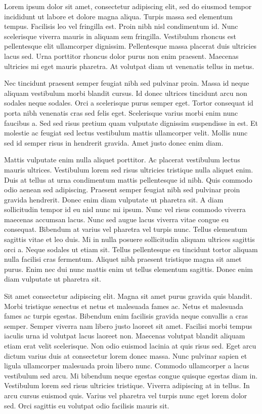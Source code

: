 Lorem ipsum dolor sit amet, consectetur adipiscing elit, sed do eiusmod tempor incididunt ut labore et dolore magna aliqua. Turpis massa sed elementum tempus. Facilisis leo vel fringilla est. Proin nibh nisl condimentum id. Nunc scelerisque viverra mauris in aliquam sem fringilla. Vestibulum rhoncus est pellentesque elit ullamcorper dignissim. Pellentesque massa placerat duis ultricies lacus sed. Urna porttitor rhoncus dolor purus non enim praesent. Maecenas ultricies mi eget mauris pharetra. At volutpat diam ut venenatis tellus in metus.

Nec tincidunt praesent semper feugiat nibh sed pulvinar proin. Massa id neque aliquam vestibulum morbi blandit cursus. Id donec ultrices tincidunt arcu non sodales neque sodales. Orci a scelerisque purus semper eget. Tortor consequat id porta nibh venenatis cras sed felis eget. Scelerisque varius morbi enim nunc faucibus a. Sed sed risus pretium quam vulputate dignissim suspendisse in est. Et molestie ac feugiat sed lectus vestibulum mattis ullamcorper velit. Mollis nunc sed id semper risus in hendrerit gravida. Amet justo donec enim diam.

Mattis vulputate enim nulla aliquet porttitor. Ac placerat vestibulum lectus mauris ultrices. Vestibulum lorem sed risus ultricies tristique nulla aliquet enim. Duis at tellus at urna condimentum mattis pellentesque id nibh. Quis commodo odio aenean sed adipiscing. Praesent semper feugiat nibh sed pulvinar proin gravida hendrerit. Donec enim diam vulputate ut pharetra sit. A diam sollicitudin tempor id eu nisl nunc mi ipsum. Nunc vel risus commodo viverra maecenas accumsan lacus. Nunc sed augue lacus viverra vitae congue eu consequat. Bibendum at varius vel pharetra vel turpis nunc. Tellus elementum sagittis vitae et leo duis. Mi in nulla posuere sollicitudin aliquam ultrices sagittis orci a. Neque sodales ut etiam sit. Tellus pellentesque eu tincidunt tortor aliquam nulla facilisi cras fermentum. Aliquet nibh praesent tristique magna sit amet purus. Enim nec dui nunc mattis enim ut tellus elementum sagittis. Donec enim diam vulputate ut pharetra sit.

Sit amet consectetur adipiscing elit. Magna sit amet purus gravida quis blandit. Morbi tristique senectus et netus et malesuada fames ac. Netus et malesuada fames ac turpis egestas. Bibendum enim facilisis gravida neque convallis a cras semper. Semper viverra nam libero justo laoreet sit amet. Facilisi morbi tempus iaculis urna id volutpat lacus laoreet non. Maecenas volutpat blandit aliquam etiam erat velit scelerisque. Non odio euismod lacinia at quis risus sed. Eget arcu dictum varius duis at consectetur lorem donec massa. Nunc pulvinar sapien et ligula ullamcorper malesuada proin libero nunc. Commodo ullamcorper a lacus vestibulum sed arcu. Mi bibendum neque egestas congue quisque egestas diam in. Vestibulum lorem sed risus ultricies tristique. Viverra adipiscing at in tellus. In arcu cursus euismod quis. Varius vel pharetra vel turpis nunc eget lorem dolor sed. Orci sagittis eu volutpat odio facilisis mauris sit.

